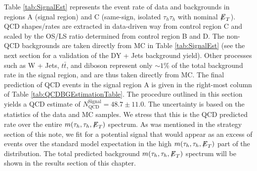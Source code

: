          
Table \ref{tab:SignalEst} represents the event rate of data and backgrounds in regions A (signal region) and C (same-sign, isolated $\tau_{h}\tau_{h}$ with nominal ${\not\mathrel{E}}_T$). QCD 
shapes/rates are extracted in data-driven way from control region C and scaled by the OS/LS ratio determined from control region B and D. The non-QCD 
backgrounds are taken directly from MC in Table \ref{tab:SignalEst} (see the next section for a validation of the DY + Jets background yield). Other processes such as W + Jets, 
$t\bar{t}$, and diboson represent only $\sim 1$\% of the total background 
rate in the signal region, and are thus taken directly from MC. The final prediction of QCD events in the signal region A is given in the right-most column of 
Table \ref{tab:QCDBGEstimationTable}. The procedure outlined in this section yields a QCD estimate of $N_{\textrm{QCD}}^{\textrm{Signal}} = 48.7 \pm 11.0$. The uncertainty is based on the 
statistics of the data and MC samples. We stress that this is the QCD predicted rate over the entire $m(\tau_{h},\tau_{h},{\not\mathrel{E}}_T)$ spectrum. As was mentioned
in the strategy section of this note, we fit for a potential signal that would appear as an excess of events over the standard model expectation in the high 
$m(\tau_{h},\tau_{h},{\not\mathrel{E}}_T)$ part of the distribution. The total predicted background $m(\tau_{h},\tau_{h},{\not\mathrel{E}}_T)$ spectrum will be shown in the results section of 
this chapter. 

\begin{table}[htbp!]

\end{table}

